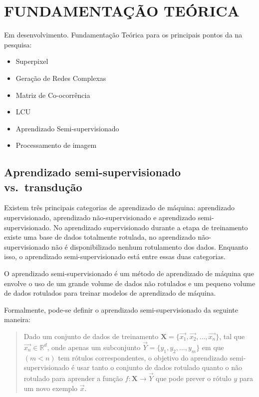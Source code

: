 \chapter{FUNDAMENTAÇÃO TEÓRICA}\label{cap:fundamentacao-teorica}

Em desenvolvimento. Fundamentação Teórica para os principais pontos da
na pesquisa:

\begin{itemize}
\item Superpixel
\item Geração de Redes Complexas
\item Matriz de Co-ocorrência
\item \gls{LCU}
\item Aprendizado Semi-supervisionado
\item Processamento de imagem
\end{itemize}



\section{Aprendizado semi-supervisionado vs.\ transdução}\label{sec:teorica-aprendizado-semi-supervisionado}

Existem três principais categorias de aprendizado de máquina:
aprendizado supervisionado, aprendizado não-supervisionado e
aprendizado semi-supervisionado. No aprendizado supervisionado durante
a etapa de treinamento existe uma base de dados totalmente rotulada,
no aprendizado não-supervisionado não é disponibilizado nenhum
rotulamento dos dados. Enquanto isso, o aprendizado
semi-supervisionado está entre essas duas categorias.

O aprendizado semi-supervisionado é um método de aprendizado de máquina
que envolve o uso de um grande volume de dados não rotulados e um
pequeno volume de dados rotulados para treinar modelos de aprendizado
de máquina.

Formalmente, pode-se definir o aprendizado semi-supervisionado da seguinte maneira:

\begin{quote}
  Dado um conjunto de dados de treinamento
  $ \mathbf{X} = \{\vec{x_1}, \vec{x_2}, \ldots, \vec{x_n}\} $, tal que $ \vec{x_n} \in \mathbb{R}^d $,
  onde apenas um subconjunto  $ \vec{Y} = \{y_1, y_2, \ldots , y_m\} $ em que $ (m < n) $ tem rótulos
  correspondentes, o objetivo do aprendizado semi-supervisionado é usar
  tanto o conjunto de dados rotulado quanto o não rotulado para aprender
  a função $ f: \mathbf{X} \rightarrow \vec{Y} $ que pode prever o rótulo $ y $ para um novo
  exemplo $ \vec{x} $.
\end{quote}

